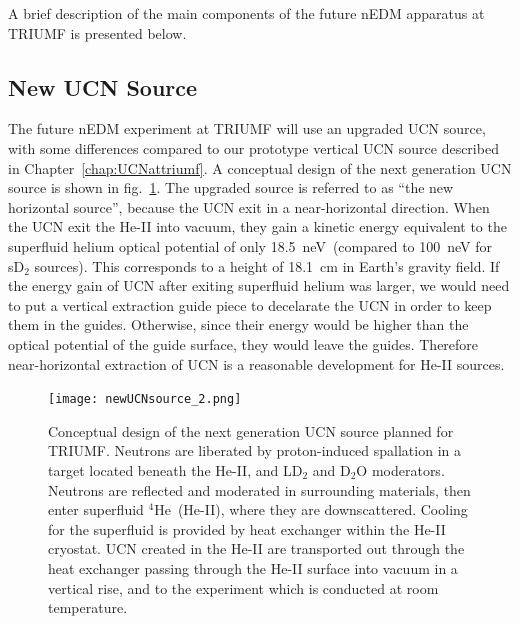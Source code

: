 A brief description of the main components of the future nEDM apparatus
at TRIUMF is presented below.

\subsection{New UCN Source\label{sec:newUCNsource}}


The future nEDM experiment at TRIUMF will use an upgraded UCN source,
with some differences compared to our prototype vertical UCN source
described in Chapter~\ref{chap:UCNattriumf}. A conceptual design of
the next generation UCN source is shown in
fig.~\ref{fig:newUCNsource_2}. The upgraded source is referred to as
``the new horizontal source'', because the UCN exit in a
near-horizontal direction. When the UCN exit the He-II into vacuum,
they gain a kinetic energy equivalent to the superfluid helium optical
potential of only 18.5~neV~(compared to 100~neV for sD$_2$
sources). This corresponds to a height of 18.1~cm in Earth’s gravity
field. If the energy gain of UCN after exiting superfluid helium was
larger, we would need to put a vertical extraction guide piece to
decelarate the UCN in order to keep them in the guides. Otherwise,
since their energy would be higher than the optical potential of the
guide surface, they would leave the guides.  Therefore near-horizontal
extraction of UCN is a reasonable development for He-II sources.

\begin{figure}[h!]
  \centering
  \texttt{[image: newUCNsource\_2.png]}
  \caption[Conceptual design of TUCAN's new UCN source]{Conceptual
    design of the next generation UCN source planned for
    TRIUMF. Neutrons are liberated by proton-induced spallation in a
    target located beneath the He-II, and LD$_2$ and D$_2$O
    moderators. Neutrons are reflected and moderated in surrounding
    materials, then enter superfluid $^4$He~(He-II), where they are
    downscattered. Cooling for the superfluid is provided by heat
    exchanger within the He-II cryostat. UCN created in the He-II are
    transported out through the heat exchanger passing through the
    He-II surface into vacuum in a vertical rise, and to the
    experiment which is conducted at room temperature.}
  \label{fig:newUCNsource_2}
\end{figure}


